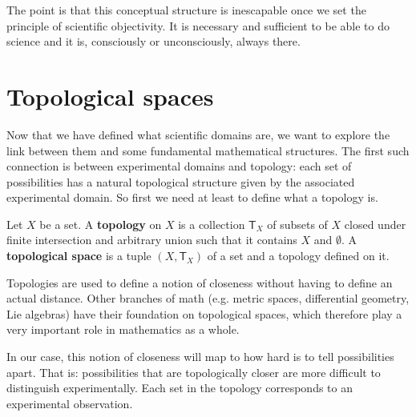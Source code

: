 \documentclass[11pt,letterpaper,fleqn]{memoir} %
\begin{document}
The point is that this conceptual structure is inescapable once we set the principle of scientific objectivity. It is necessary and sufficient to be able to do science and it is, consciously or unconsciously, always there.

\section{Topological spaces}

Now that we have defined what scientific domains are, we want to explore the link between them and some fundamental mathematical structures. The first such connection is between experimental domains and topology: each set of possibilities has a natural topological structure given by the associated experimental domain. So first we need at least to define what a topology is.

\begin{mathSection}
	\begin{defn}
		Let $X$ be a set. A \textbf{topology} on $X$ is a collection $\mathsf{T}_X$ of subsets of $X$ closed under finite intersection and arbitrary union such that it contains $X$ and $\emptyset$. A \textbf{topological space} is a tuple $(X, \mathsf{T}_X)$ of a set and a topology defined on it.
	\end{defn}
\end{mathSection}

Topologies are used to define a notion of closeness without having to define an actual distance. Other branches of math (e.g. metric spaces, differential geometry, Lie algebras) have their foundation on topological spaces, which therefore play a very important role in mathematics as a whole.

In our case, this notion of closeness will map to how hard is to tell possibilities apart. That is: possibilities that are topologically closer are more difficult to distinguish experimentally. Each set in the topology corresponds to an experimental observation.
\end{document}
